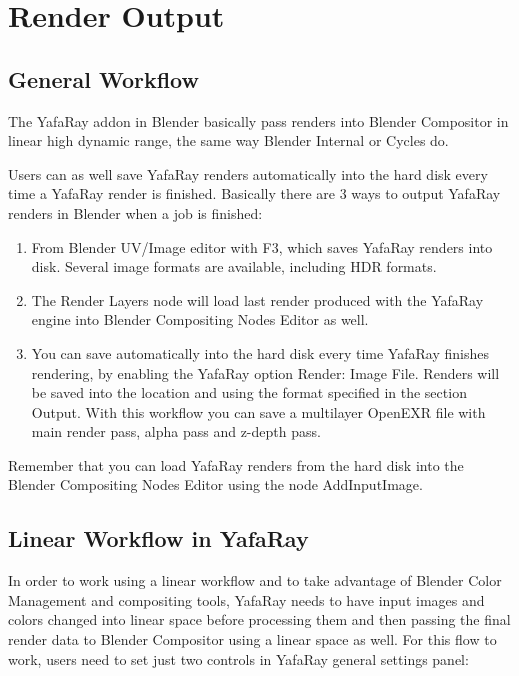 \chapter{Render Output}
\section{General Workflow}

The YafaRay addon in Blender basically pass renders into Blender Compositor in linear high dynamic range, the same way Blender Internal or Cycles do.


Users can as well save YafaRay renders automatically into the hard disk every time a YafaRay render is finished. Basically there are 3 ways to output YafaRay renders in Blender when a job is finished:

\begin{enumerate}
\item From Blender UV/Image editor with F3, which saves YafaRay renders into disk. Several image formats are available, including HDR formats.
\item The Render Layers node will load last render produced with the YafaRay engine into Blender Compositing Nodes Editor as well.
\item You can save automatically into the hard disk every time YafaRay finishes rendering, by enabling the YafaRay option Render: Image File. Renders will be saved into the location and using the format specified in the section Output. With this workflow you can save a multilayer OpenEXR file with main render pass, alpha pass and z-depth pass.
\end{enumerate}


Remember that you can load YafaRay renders from the hard disk into the Blender Compositing Nodes Editor using the node Add\textrightarrow{}Input\textrightarrow{}Image.
\section{Linear Workflow in YafaRay}

In order to work using a linear workflow and to take advantage of Blender Color Management and compositing tools, YafaRay needs to have input images and colors changed into linear space before processing them and then passing the final render data to Blender Compositor using a linear space as well. For this flow to work, users need to set just two controls in YafaRay general settings panel:

